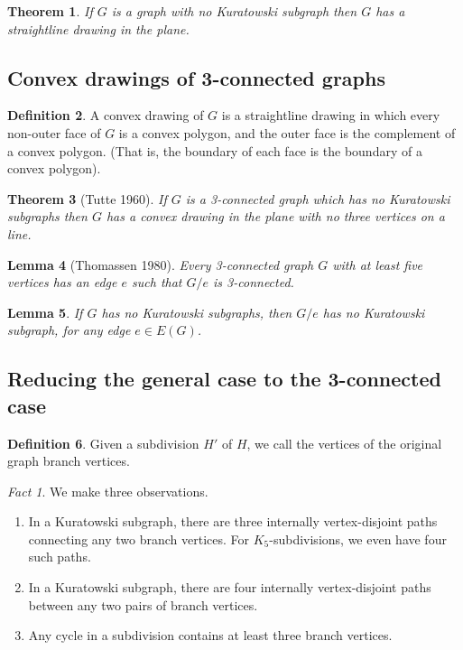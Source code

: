 \documentclass[11pt, fleqn, a4paper, landscape]{article}
\theoremstyle{plain} %
\newtheorem{thm}{Theorem}
\newtheorem{lem}[thm]{Lemma}
\theoremstyle{remark} %
\newtheorem{fact}{Fact}
\theoremstyle{definition} %
\newtheorem{defi}[thm]{Definition}
\begin{document}
\begin{multicols}{3}
\begin{thm}
If $G$ is a graph with no Kuratowski subgraph then $G$ has a straightline drawing in the plane.
\end{thm}

\subsection{Convex drawings of 3-connected graphs}

\begin{defi}
A convex drawing of $G$ is a straightline drawing in which every non-outer face of $G$ is a convex polygon, and the outer face is the complement of a convex polygon. (That is, the boundary of each face is the boundary of a convex polygon).
\end{defi}

\begin{thm}[Tutte 1960]
If $G$ is a 3-connected graph which has no Kuratowski subgraphs then
$G$ has a convex drawing in the plane with no three vertices on a line.
\end{thm}

\begin{lem}[Thomassen 1980]
Every 3-connected graph $G$ with at least five vertices has an edge
$e$ such that $G\slash e$ is 3-connected.
\end{lem}

\begin{lem}
If $G$ has no Kuratowski subgraphs, then $G\slash e$ has no Kuratowski subgraph, for any edge $e\in E(G)$.
\end{lem}

\subsection{Reducing the general case to the 3-connected case}

\begin{defi}
Given a subdivision $H'$ of $H$, we call the vertices of the original graph branch vertices.
\end{defi}
\addtocounter{thm}{1}
\begin{fact}
We make three observations. 
\begin{enumerate}
\item  In a Kuratowski subgraph, there are three internally vertex-disjoint paths connecting any two
branch vertices. For $K_5$-subdivisions, we even have four such paths.
\item In a Kuratowski subgraph, there are four internally vertex-disjoint paths between any two pairs
of branch vertices.
\item Any cycle in a subdivision contains at least three branch vertices.
\end{enumerate}
\end{fact}


\end{multicols}
\end{document}
